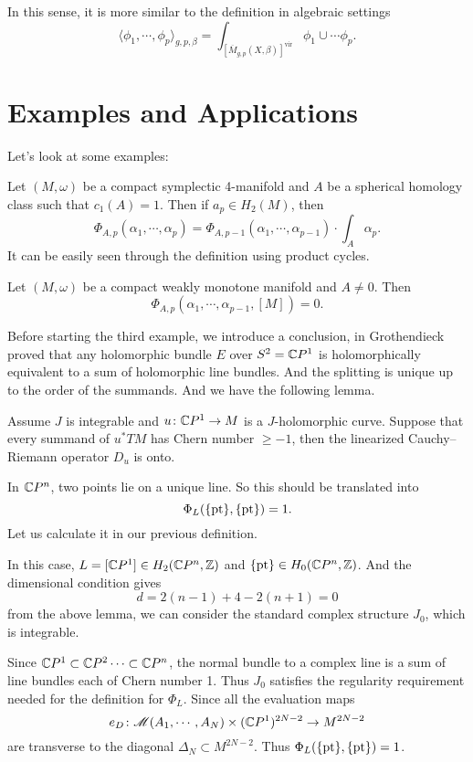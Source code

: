\documentclass[twoside]{article}
\begin{document}
In this sense, it is more similar to the definition in algebraic settings
\[\langle \phi_1,\cdots,\phi_p \rangle_{g,p,\beta}=\int_{\left[\overline{M}_{g,p}(X,\beta)\right]^{\mathrm{vir}}} \phi_1\cup\cdots\phi_p. \]

\section{Examples and Applications}

Let's look at some examples:

\begin{example}
    Let $(M,\omega)$ be a compact symplectic 4-manifold and $A$ be a spherical homology class 
    such that $c_1(A)=1$. Then if $a_p\in H_2(M)$, then
    \[\Phi_{A,p}(\alpha_1,\cdots,\alpha_p)=\Phi_{A,p-1}(\alpha_1,\cdots,\alpha_{p-1})\cdot \int_A \alpha_p.\]
    It can be easily seen through the definition using product cycles.
\end{example}

\begin{example}
    Let $(M,\omega)$ be a compact weakly monotone manifold and $A\neq 0$. Then
    \[\Phi_{A,p}(\alpha_1,\cdots,\alpha_{p-1},[M])=0.\]
\end{example}

Before starting the third example, we introduce a conclusion, 
in \cite{grothendieck} Grothendieck proved that 
any holomorphic bundle $E$ over $S^2=\mathbb{C}P^{1}$ 
is holomorphically equivalent to a sum of holomorphic line bundles. 
And the splitting is unique up to the order of the summands. 
And we have the following lemma.

\begin{lemma}
    Assume $J$ is integrable and $u\colon \mathbb{C}P^{1}\rightarrow M$ is a $J$-holomorphic curve. 
    Suppose that every summand of $u^*TM$ has Chern number $\geq -1$, 
    then the linearized Cauchy--Riemann operator $D_u$ is onto.
\end{lemma}

\begin{example}
    In $\mathbb{C}P^{n}$, two points lie on a unique line. So this should be translated into
    \[\Phi_L(\{\operatorname{pt}\},\{\operatorname{pt}\})=1.\]
    Let us calculate it in our previous definition.
    
    In this case, $L=[\mathbb{C}P^{1}]\in H_2(\mathbb{C}P^{n},\mathbb{Z})$ and $\{\operatorname{pt}\}\in H_0(\mathbb{C}P^{n},\mathbb{Z})$. 
    And the dimensional condition gives
    \[d=2(n-1)+4-2(n+1)=0\]
    from the above lemma, we can consider the standard complex structure $J_0$, which is integrable.
    
    Since $\mathbb{C}P^{1}\subset\mathbb{C}P^{2}\cdots\subset\mathbb{C}P^{n}$, 
    the normal bundle to a complex line is a sum of line bundles each of Chern number 1. 
    Thus $J_0$ satisfies the regularity requirement needed for the definition for $\Phi_L$. 
    Since all the evaluation maps 
    \[e_D\colon \mathscr{M}(A_1,\cdots,A_N)\times(\mathbb{C}P^{1})^{2N-2}\rightarrow M^{2N-2}\]
    are transverse to the diagonal $\Delta_N\subset M^{2N-2}$.
    Thus $\Phi_L(\{\operatorname{pt}\},\{\operatorname{pt}\})=1$.
\end{example}
\end{document}

